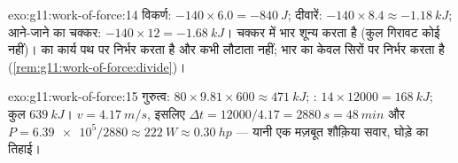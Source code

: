 \begin{solution}{exo:g11:work-of-force:14}
विकर्ण: $-140 \times 6.0 = -\qty{840}{J}$; दीवारें: $-140 \times 8.4 \approx -\qty{1.18}{kJ}$; आने-जाने का चक्कर: $-140 \times 12 = -\qty{1.68}{kJ}$। चक्कर में
भार शून्य करता है (कुल गिरावट कोई नहीं)।  का
कार्य पथ पर निर्भर करता है और कभी लौटाता नहीं; भार का केवल
सिरों पर निर्भर करता है (\cref{rem:g11:work-of-force:divide})।
\end{solution}

\begin{solution}{exo:g11:work-of-force:15}
गुरुत्व: $80 \times 9.81 \times 600 \approx \qty{471}{kJ}$; : $14 \times 12000 = \qty{168}{kJ}$; कुल $\qty{639}{kJ}$। $v = \qty{4.17}{m/s}$, इसलिए $\Delta t = 12000/4.17 = \qty{2880}{s} =
\qty{48}{min}$
और $P = \num{6.39e5}/2880 \approx \qty{222}{W} \approx
\qty{0.30}{hp}$ --- यानी एक मज़बूत शौक़िया सवार, घोड़े का तिहाई।
\end{solution}


